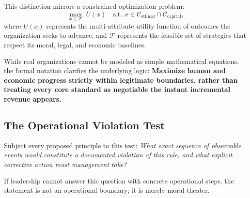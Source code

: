 This distinction mirrors a constrained optimization problem:
\begin{equation}
\max_{x \in \mathcal{F}} \; U(x) \quad \text{s.t. } x \in \mathcal{C}_{\text{ethical}} \cap \mathcal{C}_{\text{capital}},
\label{eq:constrained-optimization}
\end{equation}
where $U(x)$ represents the multi-attribute utility function of outcomes the organization seeks to advance, and $\mathcal{F}$ represents the feasible set of strategies that respect its moral, legal, and economic baselines.

While real organizations cannot be modeled as simple mathematical equations, the formal notation clarifies the underlying logic: \textbf{Maximize human and economic progress strictly within legitimate boundaries, rather than treating every core standard as negotiable the instant incremental revenue appears.}

\subsection{The Operational Violation Test}

Subject every proposed principle to this test: \textit{What exact sequence of observable events would constitute a documented violation of this rule, and what explicit corrective action must management take?}

If leadership cannot answer this question with concrete operational steps, the statement is not an operational boundary; it is merely moral theater.
